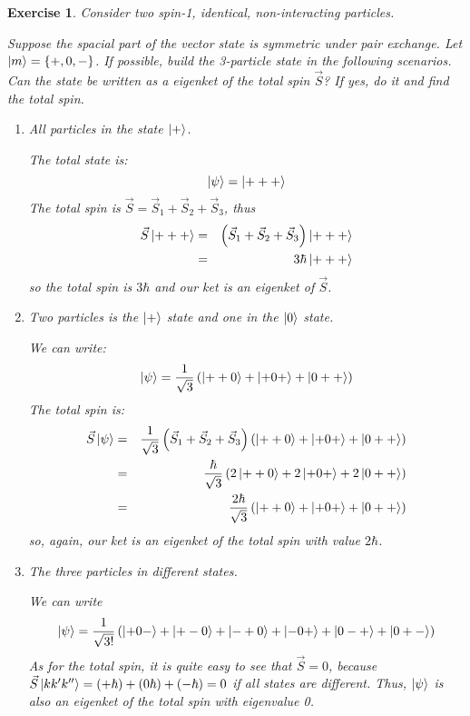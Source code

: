 \documentclass[12pt]{article}
\def\be{\begin{equation}}
\def\ee{\end{equation}}
\def\bea{\begin{eqnarray*}}
\def\eea{\end{eqnarray*}}
\def\f{\frac}
\def\l{\left}
\def\r{\right}
\newtheorem{exercise}{Exercise}
\begin{document}
	\begin{exercise}
		Consider two spin-1, identical, non-interacting particles.
		\begin{exercises}
			\item Suppose the spacial part of the vector state is symmetric under pair exchange. Let $\ket{m}=\{ +, 0, - \}$. If possible, build the 3-particle state in the following scenarios. Can the state be written as a eigenket of the total spin $\vec{S}$? If yes, do it and find the total spin. 
			\begin{enumerate}
				\item All particles in the state $\ket{+}$. 
				\begin{multianswer}
					The total state is:
					\be
						\ket{\psi} = \ket{+++}
					\ee
					The total spin is $\vec{S} = \vec{S}_1 + \vec{S}_2 + \vec{S}_3$, thus
					\bea
						\vec{S}\ket{+++} &=& \l(\vec{S}_1 + \vec{S}_2 + \vec{S}_3\r)\ket{+++} \\
							&=& 3\hbar \ket{+++}
					\eea
					so the total spin is $3\hbar$ and our ket is an eigenket of $\vec{S}$. 
				\end{multianswer}
				\item Two particles is the $\ket{+}$ state and one in the $\ket{0}$ state. 
				\begin{multianswer}
					We can write:
					\be
						\ket{\psi} = \f{1}{\sqrt{3}}\l( \ket{++0} + \ket{+0+} + \ket{0++} \r)
					\ee
					The total spin is:
					\bea
						\vec{S}\ket{\psi} &=& \f{1}{\sqrt{3}} \l(\vec{S}_1 + \vec{S}_2 + \vec{S}_3\r) \l( \ket{++0} + \ket{+0+} + \ket{0++} \r) \\
							&=& \f{\hbar}{\sqrt{3}} \l( 2\ket{++0} + 2\ket{+0+} + 2\ket{0++} \r) \\
							&=& \f{2\hbar}{\sqrt{3}} \l( \ket{++0} + \ket{+0+} + \ket{0++} \r)
					\eea
					so, again, our ket is an eigenket of the total spin with value $2\hbar$. 
				\end{multianswer}
				\item The three particles in different states.
				\begin{multianswer}
					We can write
					\be
						\ket{\psi} = \f{1}{\sqrt{3!}}\l( \ket{+0-} + \ket{+-0} + \ket{-+0} + \ket{-0+} + \ket{0-+} + \ket{0+-} \r)
					\ee
					As for the total spin, it is quite easy to see that $\vec{S}=0$, because $\vec{S}\ket{kk'k''}=(+\hbar) + (0\hbar) + (-\hbar) = 0$ if all states are different. Thus, $\ket{\psi}$ is also an eigenket of the total spin with eigenvalue 0. 
				\end{multianswer}
			\end{enumerate}
			

\end{exercises}
\end{exercise}
\end{document}
